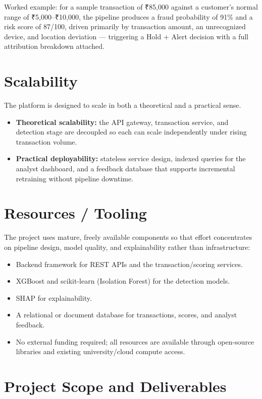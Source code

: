 \documentclass[11pt,letterpaper]{article}
\begin{document}
Worked example: for a sample transaction of ₹85,000 against a customer's normal range of ₹5,000--₹10,000, the pipeline produces a fraud probability of 91\% and a risk score of 87/100, driven primarily by transaction amount, an unrecognized device, and location deviation --- triggering a Hold + Alert decision with a full attribution breakdown attached.

\section{Scalability}
The platform is designed to scale in both a theoretical and a practical sense.
\begin{itemize}
    \item \textbf{Theoretical scalability:} the API gateway, transaction service, and detection stage are decoupled so each can scale independently under rising transaction volume.
    \item \textbf{Practical deployability:} stateless service design, indexed queries for the analyst dashboard, and a feedback database that supports incremental retraining without pipeline downtime.
\end{itemize}

\section{Resources / Tooling}
The project uses mature, freely available components so that effort concentrates on pipeline design, model quality, and explainability rather than infrastructure:
\begin{itemize}
    \item Backend framework for REST APIs and the transaction/scoring services.
    \item XGBoost and scikit-learn (Isolation Forest) for the detection models.
    \item SHAP for explainability.
    \item A relational or document database for transactions, scores, and analyst feedback.
    \item No external funding required; all resources are available through open-source libraries and existing university/cloud compute access.
\end{itemize}

\newpage
\section{Project Scope and Deliverables}
\end{document}
